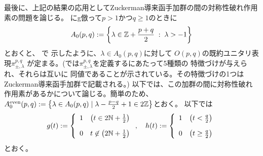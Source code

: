 \documentclass[notes,notheorems]{beamer}
\newcommand{\nin}{\not\in}
\theoremstyle{definition}
\theoremstyle{example}
\theoremstyle{plain}
\theoremstyle{mystyle}
\begin{document}
\begin{frame}{}
	最後に、上記の結果の応用としてZuckerman導来函手加群の間の対称性破れ作用素の問題を論じる。
\cite[(5.1.1)]{KO2}にg{倣}って$p>1${かつ}$q\ge1$のときに\begin{equation*}
	A_0(p,q):=\left\{ \lambda\in\mathbb{Z}+\frac{p+q}{2}\;:\;\lambda>-1 \right\}
\end{equation*}とおくと、
\cite{KO2}で
示したように、$\lambda\in A_0(p,q)$に対して
$O(p,q)$の既約ユニタリ表現$\pi_{\pm,\lambda}^{p,q}$
が定まる。(\cite{KO2}では$\pi_{\pm,\lambda}^{p,q}$を定義するにあたって5種類の
特徴づけが与えら{れ}、それらは互いに
同値であることが示されている。その特徴づけの1つは
Zuckerman導来函手加群で記載される。)
以下では、この加群の間に対称性破れ作用素がある{か}について論じる。簡単のため、$A_0^{\mbox{\scriptsize even}}(p,q):=\left\{ \lambda\in A_0(p,q)\mid \lambda-\frac{p-q}{2}+1\in2\mathbb{Z} \right\}$とおく。
以下では\begin{equation*}
	g(t):=\left\{ \begin{array}[]{ll}
		1&\left(t\in2\N+\frac{1}{2}  \right)\\[10pt]
		0&t\nin \left(2\N+\frac{1}{2}  \right)
	\end{array}\right.,\quad h(t):=\left\{ \begin{array}[]{ll}
		1&\left(  t<\frac{q}{2}\right)
		\\[10pt]
		0&\left( t\ge\frac{q}{2} \right)
\end{array}\right.
\end{equation*}とおく。
\end{frame}
\end{document}

